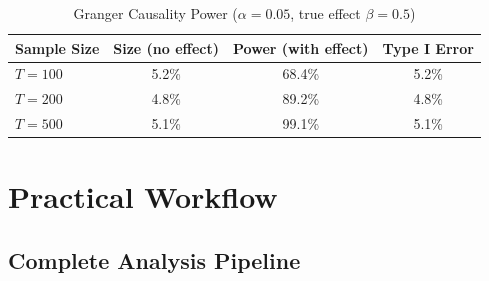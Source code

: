 \begin{table}[h]
\centering
\caption{Granger Causality Power ($\alpha=0.05$, true effect $\beta=0.5$)}
\begin{tabular}{lccc}
\toprule
Sample Size & Size (no effect) & Power (with effect) & Type I Error \\
\midrule
$T=100$ & 5.2\% & 68.4\% & 5.2\% \\
$T=200$ & 4.8\% & 89.2\% & 4.8\% \\
$T=500$ & 5.1\% & 99.1\% & 5.1\% \\
\bottomrule
\end{tabular}
\end{table}


\section{Practical Workflow}

\subsection{Complete Analysis Pipeline}

